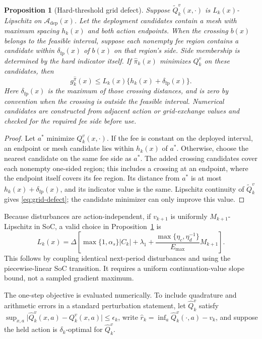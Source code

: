 \documentclass[preprint,11pt]{elsarticle}
\newcommand{\cA}{\mathcal{A}}
\theoremstyle{plain}
\newtheorem{proposition}{Proposition}
\theoremstyle{remark}
\begin{document}
\begin{proposition}[Hard-threshold grid defect]
\label{prop:grid-defect}
Suppose $\widetilde Q_k^v(x,\cdot)$ is $L_k(x)$-Lipschitz on
$\cA_{\mathrm{dep}}(x)$. Let the deployment candidates contain a mesh
with maximum spacing $h_k(x)$ and both action endpoints. When the crossing
$b(x)$ belongs to the feasible interval, suppose each nonempty fee region
contains a candidate within $\delta_{\mathrm{fp}}(x)$ of $b(x)$ on that
region's side. Side membership is determined by the hard indicator itself.
If $\widehat\pi_k(x)$ minimizes $Q_k^v$ on these candidates, then
\begin{equation}
 g_k^{\widehat\pi}(x)
 \leq L_k(x)\{h_k(x)+\delta_{\mathrm{fp}}(x)\}.
 \label{eq:grid-defect}
\end{equation}
Here $\delta_{\mathrm{fp}}(x)$ is the maximum of those crossing distances,
and is zero by convention when the crossing is outside the feasible interval.
Numerical candidates are constructed from adjacent action or grid-exchange
values and checked for the required fee side before use.
\end{proposition}

\begin{proof}
Let $a^*$ minimize $Q_k^v(x,\cdot)$. If the fee is constant on the deployed
interval, an endpoint or mesh candidate lies within $h_k(x)$ of
$a^*$. Otherwise, choose the nearest candidate on the same fee side as $a^*$.
The added crossing candidates cover each nonempty one-sided region; this
includes a crossing at an endpoint, where the endpoint itself covers its
fee region. Its distance from $a^*$ is at most
$h_k(x)+\delta_{\mathrm{fp}}(x)$, and its indicator value is the same.
Lipschitz continuity of $\widetilde Q_k^v$ gives \eqref{eq:grid-defect}; the
candidate minimizer can only improve this value.
\end{proof}

Because disturbances are action-independent, if $v_{k+1}$ is uniformly
$M_{k+1}$-Lipschitz in SoC, a valid choice in
Proposition~\ref{prop:grid-defect} is
\begin{equation}
 L_k(x)=\Delta\left[
 \max\{1,\alpha_s\}\lvert C_k\rvert+\lambda_1
 +\frac{\max\{\eta_c,\eta_d^{-1}\}}{E_{\max}}M_{k+1}\right].
\end{equation}
This follows by coupling identical next-period disturbances and using the
piecewise-linear SoC transition. It requires a uniform continuation-value
slope bound, not a sampled gradient maximum.

The one-step objective is evaluated numerically. To include quadrature and
arithmetic errors in a standard perturbation statement, let
$\widehat Q_k^v$ satisfy
$\sup_{x,a}\lvert\widehat Q_k^v(x,a)-Q_k^v(x,a)\rvert\leq\epsilon_k$,
write $\widehat r_k=\inf_a\widehat Q_k^v(\cdot,a)-v_k$, and suppose the held
action is $\delta_k$-optimal for $\widehat Q_k^v$.
\end{document}
